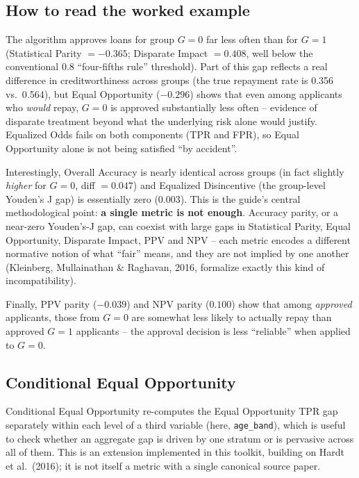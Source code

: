 \documentclass[11pt]{article}
\begin{document}
\subsection{How to read the worked example}

The algorithm approves loans for group $G=0$ far less often than for $G=1$
(Statistical Parity $=-0.365$; Disparate Impact $=0.408$, well below the
conventional 0.8 ``four-fifths rule'' threshold). Part of this gap reflects
a real difference in creditworthiness across groups (the true repayment rate
is 0.356 vs.\ 0.564), but Equal Opportunity ($-0.296$) shows that even among
applicants who \emph{would} repay, $G=0$ is approved substantially less often
-- evidence of disparate treatment beyond what the underlying risk alone
would justify. Equalized Odds fails on both components (TPR and FPR), so
Equal Opportunity alone is not being satisfied ``by accident''.

Interestingly, Overall Accuracy is nearly identical across groups (in fact
slightly \emph{higher} for $G=0$, diff $=0.047$) and Equalized Disincentive
(the group-level Youden's J gap) is essentially zero ($0.003$). This is the
guide's central methodological point: \textbf{a single metric is not enough}.
Accuracy parity, or a near-zero Youden's-J gap, can coexist with large gaps
in Statistical Parity, Equal Opportunity, Disparate Impact, PPV and NPV --
each metric encodes a different normative notion of what ``fair'' means, and
they are not implied by one another (Kleinberg, Mullainathan \& Raghavan,
2016, formalize exactly this kind of incompatibility).

Finally, PPV parity ($-0.039$) and NPV parity ($0.100$) show that among
\emph{approved} applicants, those from $G=0$ are somewhat less likely to
actually repay than approved $G=1$ applicants -- the approval decision is
less ``reliable'' when applied to $G=0$.

\subsection{Conditional Equal Opportunity}

Conditional Equal Opportunity re-computes the Equal Opportunity TPR gap
separately within each level of a third variable (here, \texttt{age\_band}),
which is useful to check whether an aggregate gap is driven by one stratum or
is pervasive across all of them. This is an extension implemented in this
toolkit, building on Hardt et al.\ (2016); it is not itself a metric with a
single canonical source paper.
\end{document}
